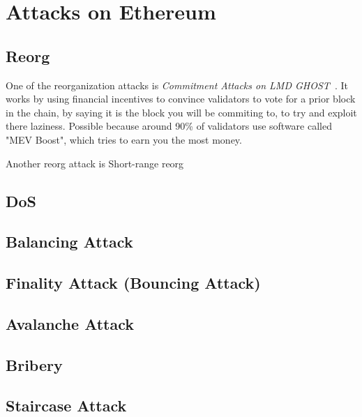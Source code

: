 
\section{Attacks on Ethereum}\label{sec:attacks-on-ethereum}
\subsection{Reorg}\label{subsec:reorg}
One of the reorganization attacks is \textit{Commitment Attacks on LMD GHOST}~\cite{sarenche2024breakingbalancepowercommitment}.
It works by using financial incentives to convince validators to vote for a prior block in the chain, by saying it is the block you will be commiting to, to try and exploit there laziness.
Possible because around 90\% of validators use software called "MEV Boost", which tries to earn you the most money.

Another reorg attack is Short-range reorg


\subsection{DoS}\label{subsec:dos}

\subsection{Balancing Attack}\label{subsec:balancing-attack}

\subsection{Finality Attack (Bouncing Attack)}\label{subsec:finality-attack-(bouncing-attack)}

\subsection{Avalanche Attack}\label{subsec:avalanche-attack}

\subsection{Bribery}\label{subsec:bribery}

\subsection{Staircase Attack}\label{subsec:staircase-attack}